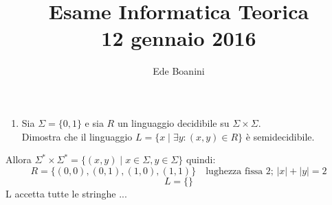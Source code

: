 \documentclass{article}  %
\title{Esame Informatica Teorica \\ 12 gennaio 2016}
\author{Ede Boanini}
\date{}  %
\begin{document}
\maketitle
\begin{esercizio}[Esercizio 1]
\begin{enumerate}
    \item Sia $\Sigma=\{0,1\}$ e sia $R$ un linguaggio decidibile su $\Sigma \times \Sigma$. \\ Dimostra che il 
    linguaggio $L=\{x \mid \exists y : (x,y) \in R\}$ è semidecidibile.
\end{enumerate}
Allora $\Sigma^* \times \Sigma^* = \{(x,y) \mid x\in \Sigma, y \in \Sigma\}$ quindi: \\
\[
R = \{(0, 0), (0, 1), (1, 0), (1, 1)\} \quad \text{lughezza fissa 2; } |x|+|y|=2
\]
\[
L = \{\}
\]
L accetta tutte le stringhe ...
\end{esercizio}
\end{document}
